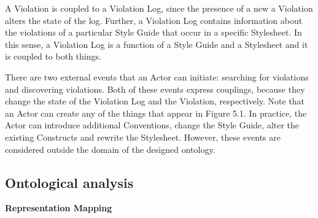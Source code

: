 \documentclass[parskip=full]{uvamscse}
\begin{document}
A Violation is coupled to a Violation Log, since the presence of a new a Violation alters the state of the log. Further, a Violation Log contains information about the violations of a particular Style Guide that occur in a specific Stylesheet. In this sense, a Violation Log is a function of a Style Guide and a Stylesheet and it is coupled to both things.

There are two external events that an Actor can initiate: searching for violations and discovering violations. Both of these events express couplings, because they change the state of the Violation Log and the Violation, respectively. Note that an Actor can create any of the things that appear in Figure 5.1. In practice, the Actor can introduce additional Conventions, change the Style Guide, alter the existing Constructs and rewrite the Stylesheet. However, these events are considered outside the domain of the designed ontology. 

\subsection{Ontological analysis}

\textbf{Representation Mapping}
\end{document}
